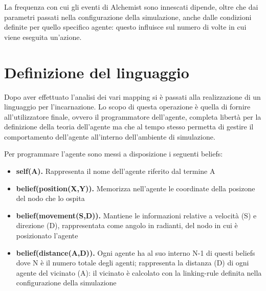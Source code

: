 \documentclass[12pt,a4paper,openright,twoside]{report}
\begin{document}
La frequenza con cui gli eventi di Alchemist sono innescati dipende, oltre che dai parametri passati nella configurazione della simulazione, anche dalle condizioni definite per quello specifico agente: questo influisce sul numero di volte in cui viene eseguita un'azione.

\section{Definizione del linguaggio}
Dopo aver effettuato l'analisi dei vari mapping si \`e passati alla realizzazione di un linguaggio per l'incarnazione. Lo scopo di questa operazione \`e quella di fornire all'utilizzatore finale, ovvero il programmatore dell'agente, completa libert\`a per la definizione della teoria dell'agente ma che al tempo stesso permetta di gestire il comportamento dell'agente all'interno dell'ambiente di simulazione.

Per programmare l'agente sono messi a disposizione i seguenti beliefs:
\begin{itemize}
   \item \textbf{self(A).} Rappresenta il nome dell'agente riferito dal termine A
   \item \textbf{belief(position(X,Y)).} Memorizza nell'agente le coordinate della posizone del nodo che lo ospita
   \item \textbf{belief(movement(S,D)).} Mantiene le informazioni relative a velocit\`a (S) e direzione (D), rappresentata come angolo in radianti, del nodo in cui \`e posizionato l'agente
   \item \textbf{belief(distance(A,D)).} Ogni agente ha al suo interno N-1 di questi beliefs dove N \`e il numero totale degli agenti; rappresenta la distanza (D) di ogni agente del vicinato (A): il vicinato \`e calcolato con la linking-rule definita nella configurazione della simulazione
\end{itemize}
\end{document}
